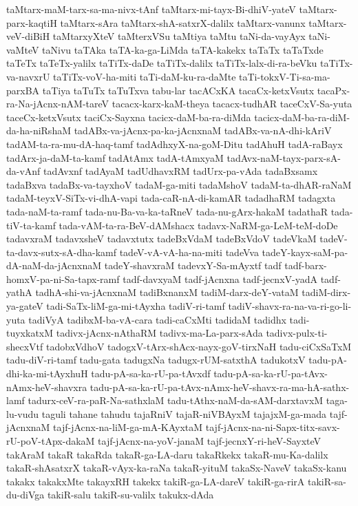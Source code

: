 {taMtarx-maM-tarx-sa-ma-nivx-tAnf
taMtarx-mi-tayx-Bi-dhiV-yateV
taMtarx-parx-kaqtiH
taMtarx-sAra
taMtarx-shA-satxrX-dalilx
taMtarx-vanunx
taMtarx-veV-diBiH
taMtarxyXteV
taMterxVSu
taMtiya
taMtu
taNi-da-vayAyx
taNi-vaMteV
taNivu
taTAka
taTA-ka-ga-LiMda
taTA-kakekx
taTaTx
taTaTxde
taTeTx
taTeTx-yalilx
taTiTx-daDe
taTiTx-dalilx
taTiTx-lalx-di-ra-beVku
taTiTx-va-navxrU
taTiTx-voV-ha-miti
taTi-daM-ku-ra-daMte
taTi-tokxV-Ti-sa-ma-parxBA
taTiya
taTuTx
taTuTxva
tabu-lar
tacACxKA
tacaCx-ketxVsutx
tacaPx-ra-Na-jAcnx-nAM-tareV
tacacx-karx-kaM-theya
tacacx-tudhAR
taceCxV-Sa-yuta
taceCx-ketxVsutx
taciCx-Sayxna
tacicx-daM-ba-ra-diMda
tacicx-daM-ba-ra-diM-da-ha-niRshaM
tadABx-va-jAcnx-pa-ka-jAcnxnaM
tadABx-va-nA-dhi-kAriV
tadAM-ta-ra-mu-dA-haq-tamf
tadAdhxyX-na-goM-Ditu
tadAhuH
tadA-raBayx
tadArx-ja-daM-ta-kamf
tadAtAmx
tadA-tAmxyaM
tadAvx-naM-tayx-parx-sA-da-vAnf
tadAvxnf
tadAyaM
tadUdhavxRM
tadUrx-pa-vAda
tadaBxsamx
tadaBxva
tadaBx-va-tayxhoV
tadaM-ga-miti
tadaMshoV
tadaM-ta-dhAR-raNaM
tadaM-teyxV-SiTx-vi-dhA-vapi
tada-caR-nA-di-kamAR
tadadhaRM
tadagxta
tada-naM-ta-ramf
tada-nu-Ba-va-ka-taRneV
tada-nu-gArx-hakaM
tadathaR
tada-tiV-ta-kamf
tada-vAM-ta-ra-BeV-dAMshacx
tadavx-NaRM-ga-LeM-teM-doDe
tadavxraM
tadavxsheV
tadavxtutx
tadeBxVdaM
tadeBxVdoV
tadeVkaM
tadeV-ta-davx-sutx-sA-dha-kamf
tadeV-vA-vA-ha-na-miti
tadeVva
tadeY-kayx-saM-pa-dA-naM-da-jAcnxnaM
tadeY-shavxraM
tadevxY-Sa-mAyxtf
tadf
tadf-barx-homxV-pa-ni-Sa-tapx-ramf
tadf-davxyaM
tadf-jAcnxna
tadf-jecnxV-yadA
tadf-yathA
tadhA-shi-va-jAcnxnaM
tadiBxnanxM
tadiM-darx-deY-vataM
tadiM-dirx-ya-gateV
tadi-SaTx-liM-ga-mi-tAyxha
tadiV-ri-tamf
tadiV-shavx-ra-na-va-ri-go-li-yuta
tadiVyA
tadibxM-ba-vA-cara
tadi-caCxMti
tadidaM
tadidhx
tadi-tuyxkatxM
tadivx-jAcnx-nAthaRM
tadivx-ma-La-parx-sAda
tadivx-pulx-ti-shecxVtf
tadobxVdhoV
tadogxV-tArx-shAcx-nayx-goV-tirxNaH
tadu-ciCxSaTxM
tadu-diV-ri-tamf
tadu-gata
tadugxNa
tadugx-rUM-satxthA
tadukotxV
tadu-pA-dhi-ka-mi-tAyxhuH
tadu-pA-sa-ka-rU-pa-tAvxdf
tadu-pA-sa-ka-rU-pa-tAvx-nAmx-heV-shavxra
tadu-pA-sa-ka-rU-pa-tAvx-nAmx-heV-shavx-ra-ma-hA-sathx-lamf
tadurx-ceV-ra-paR-Na-sathxlaM
tadu-tAthx-naM-da-sAM-darxtavxM
taga-lu-vudu
taguli
tahane
tahudu
tajaRniV
tajaR-niVBAyxM
tajajxM-ga-mada
tajf-jAcnxnaM
tajf-jAcnx-na-liM-ga-mA-KAyxtaM
tajf-jAcnx-na-ni-Sapx-titx-savx-rU-poV-tApx-dakaM
tajf-jAcnx-na-yoV-janaM
tajf-jecnxY-ri-heV-SayxteV
takAraM
takaR
takaRda
takaR-ga-LA-daru
takaRkekx
takaR-mu-Ka-dalilx
takaR-shAsatxrX
takaR-vAyx-ka-raNa
takaR-yituM
takaSx-NaveV
takaSx-kanu
takakx
takakxMte
takayxRH
takekx
takiR-ga-LA-dareV
takiR-ga-rirA
takiR-sa-du-diVga
takiR-salu
takiR-su-valilx
takukx-dAda
}
